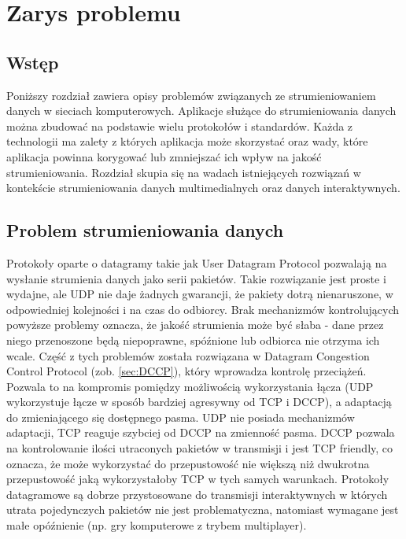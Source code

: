 \chapter{Zarys problemu}
\label{cha:rozdzial2}


\section{Wstęp}

Poniższy rozdział zawiera opisy problemów związanych ze strumieniowaniem danych w sieciach komputerowych. Aplikacje służące do strumieniowania danych można zbudować na podstawie wielu protokołów i standardów. Każda z technologii ma zalety z których aplikacja może skorzystać oraz wady, które aplikacja powinna korygować lub zmniejszać ich wpływ na jakość strumieniowania. Rozdział skupia się na wadach istniejących rozwiązań w kontekście strumieniowania danych multimedialnych oraz danych interaktywnych.

\section{Problem strumieniowania danych}

Protokoły oparte o datagramy takie jak User Datagram Protocol pozwalają na wysłanie strumienia danych jako serii pakietów. Takie rozwiązanie jest proste i wydajne, ale UDP nie daje żadnych gwarancji, że pakiety dotrą nienaruszone, w odpowiedniej kolejności i na czas do odbiorcy. Brak mechanizmów kontrolujących powyższe problemy oznacza, że jakość strumienia może być słaba - dane przez niego przenoszone będą niepoprawne, spóźnione lub odbiorca nie otrzyma ich wcale. Część z tych problemów została rozwiązana w Datagram Congestion Control Protocol (zob. \ref{sec:DCCP}), który wprowadza kontrolę przeciążeń. Pozwala to na kompromis pomiędzy możliwością wykorzystania łącza (UDP wykorzystuje łącze w sposób bardziej agresywny od TCP i DCCP), a adaptacją do zmieniającego się dostępnego pasma. UDP nie posiada mechanizmów adaptacji, TCP reaguje szybciej od DCCP na zmienność pasma. DCCP pozwala na kontrolowanie ilości utraconych pakietów w transmisji i jest TCP friendly, co oznacza, że może wykorzystać do przepustowość nie większą niż dwukrotna przepustowość jaką wykorzystałoby TCP w tych samych warunkach. Protokoły datagramowe są dobrze przystosowane do transmisji interaktywnych w których utrata pojedynczych pakietów nie jest problematyczna, natomiast wymagane jest małe opóźnienie (np. gry komputerowe z trybem multiplayer).

